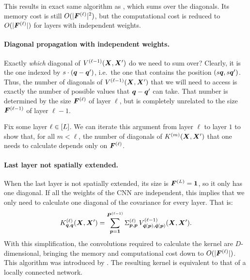 \documentclass[accepted]{uai2021} %
\newcommand{\layersizebase}{\vF}
\newcommand{\layersize}[1]{{\layersizebase^{\bra{#1}}}}
\newcommand{\patchsizebase}{\vP}
\newcommand{\patchsize}[1]{{\patchsizebase^{\bra{#1}}}}
\newcommand{\patchf}[2]{{\tilde#1\bra{#2}}}
\newcommand{\priorWcovs}[1]{\Sigma^{(#1)}}
\newcommand{\patch}{\vp}               %
\newcommand{\nextpatch}{\vq}
\newcommand{\covf}[1]{K\ssup{#1}}
\newcommand{\nlinf}[1]{V\ssup{#1}}
\newcommand{\0}{\boldsymbol{0}}
\newcommand{\1}{\boldsymbol{1}}
\begin{document}
This results in exact same algorithm as \citet{arora2019exact}, which sums over the diagonals. Its memory cost is still $O(\absshort{\layersize{\ell}}^{2})$, but the computational cost is reduced to $O(\absshort{\layersize{\ell}})$ for layers with independent weights.

\paragraph{Diagonal propagation with independent weights.}
Exactly \emph{which} diagonal of $\nlinf{\ell-1}\bra{\mX, \mX'}$ do we need to sum over? Clearly, it is the one indexed by $s\cdot\bra{\nextpatch - \nextpatch'}$, i.e.~the one that contains the position $\bra{s\nextpatch, s\nextpatch'}$. Thus, the number of diagonals of $\nlinf{\ell-1}\bra{\mX, \mX'}$ that we will need to access is exactly the number of possible values that $\nextpatch-\nextpatch'$ can take. That number is determined by the size $\layersize{\ell}$ of layer $\ell$, but is completely unrelated to the size $\layersize{\ell-1}$ of layer $\ell-1$.

Fix some layer $\ell\in[L]$.
We can iterate this argument from layer $\ell$ to layer $1$ to show that, for all $m < \ell$, the number of diagonals of $\covf{m}\bra{\mX,\mX'}$ that one needs to calculate depends only on $\layersize{\ell}$.

\paragraph{Last layer not spatially extended.} When the last layer is not spatially extended, its size is $\layersize{L}=\1$, so it only has one diagonal. If all the weights of the CNN are independent, this implies that we only need to calculate one diagonal of the covariance for every layer. That is:
\begin{equation}
\covf{\ell}_{\nextpatch,\nextpatch}\bra{\mX, \mX'} =
\sum_{\patch=\1}^{\patchsize{\ell-1}}
\priorWcovs{\ell}_{\patch,\patch} \,
\nlinf{\ell-1}_{\patchf{\nextpatch}{\patch},\patchf{\nextpatch}{\patch}}\bra{\mX, \mX'}.
\label{eq:cnn-kernel-independent-diagonal}
\end{equation}
With this simplification, the convolutions required to calculate the kernel are
$D$-dimensional, bringing the memory and computational cost down to $O(\absshort{\layersize{\ell}})$. This algorithm was introduced by \citet{garriga2018infiniteconv}. The resulting kernel is equivalent to that of a locally connected network.
\end{document}
